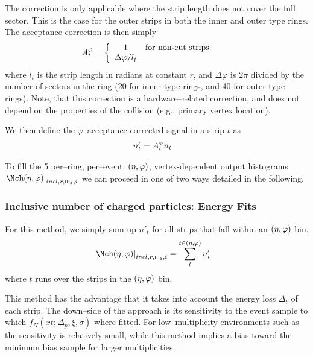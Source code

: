 The correction is only applicable where the strip length does not
cover the full sector.  This is the case for the outer strips in both
the inner and outer type rings.  The acceptance correction is then
simply
\begin{align}
  \label{eq:acc_corr}
  A^{\varphi}_{t}{} &=
     \left\{
       \begin{array}{cl}
         1 & \text{for non-cut strips}\\
         \Delta\varphi/l_t & \\
       \end{array}\right.
     \quad
\end{align}
where $l_t$ is the strip length in radians at constant $r$, and
$\Delta\varphi$ is $2\pi$ divided by the number of sectors in the ring
(20 for inner type rings, and 40 for outer type rings). Note, that
this correction is a hardware--related correction, and does not depend
on the properties of the collision (e.g., primary vertex location).

We then define the $\varphi$--acceptance corrected signal in a strip
$t$ as 
\begin{align}
  n'_t &= A^{\varphi}_{t}{} n_t
\end{align}

To fill the 5 per--ring, per--event, $(\eta,\varphi)$, vertex-dependent
output histograms $\dndetadphi[incl,r,\subIPz,i]$ we can proceed in
one of two ways detailed in the following.

\subsubsection{Inclusive number of charged particles: Energy Fits} 
\label{sec:sub:sub:eloss_fits}

For this method, we simply sum up $n'_t$ for all strips that fall
within an $(\eta,\varphi)$ bin.  
\begin{align}
  \label{eq:density1}
  \dndetadphi[incl,r,\subIPz,i] &= \sum_t^{t\in\etaphi} n'_t
\end{align}
where $t$ runs over the strips in the $(\eta,\varphi)$ bin. 

This method has the advantage that it takes into account the energy
loss $\Delta_t$ of each strip.  The down--side of the approach is its
sensitivity to the event sample to which $f_N(xt;\Delta_p,\xi,\sigma)$
where fitted.  For low--multiplicity environments such as \ppCol{} the
sensitivity is relatively small, while this method implies a bias
toward the minimum bias sample for larger multiplicities.

